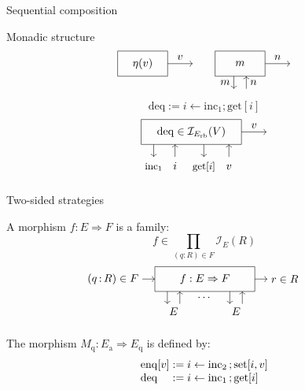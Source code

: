 \documentclass{beamer}
\newcommand{\kw}[1]{\ensuremath{ \mathrm{#1} }}
\newcommand{\deqpic}[3]{%
  \begin{tikzpicture}[scale=0.4]
    \draw (-4,-1) rectangle (4,1);
    \node (x) at (0,0) {$#1$};
    \draw[->] (-3, -1) -- (-3, -2);
    \node[anchor=base] at (-3, -3) {\small $\kw{inc}_1$};
    \draw[<-] (-1.3, -1) -- (-1.3, -2);
    \node[anchor=base] at (-1.3, -3) {$#2$};
    \draw[->] (1, -1) -- (1, -2);
    \node[anchor=base] at (1, -3) {\small $\kw{get}[#2]$};
    \draw[<-] (3, -1) -- (3, -2);
    \node[anchor=base] at (3, -3) {$#3$};
    \draw[->] (4,0) -- node[above] {$#3$} (6,0);
  \end{tikzpicture}%
}
\begin{document}
\begin{frame}[fragile]{Sequential composition}
\begin{block}{Monadic structure}
\[    %
    \begin{tikzpicture}[scale=0.4,baseline=0]
      \draw (-2,-1) rectangle (2,1);
      \draw[->] (2,0) -- node[above] {$v$} (4,0);
      \node (L) at (0,0) {$\eta(v)$};
    \end{tikzpicture}
    \qquad
    \begin{tikzpicture}[scale=0.4,baseline=0]
      \draw (-2,-1) rectangle (2,1);
      \draw[->] (2,0) -- node[above] {$n$} (4,0);
      \node (L) at (0,0) {$m$};
      \draw[->] (-0.5, -1) -- node[left]  {$m$} (-0.5, -2);
      \draw[->] ( 0.5, -2) -- node[right] {$n$} ( 0.5, -1);
    \end{tikzpicture}
  \]
\end{block}

\begin{example}
  \[
    \kw{deq} :=
      i \leftarrow \kw{inc}_1 \mathrel{;} \kw{get}[i]
  \]
  \[
    \deqpic{\kw{deq} \in \mathcal{I}_{E_\kw{rb}}(V)}{i}{v}
  \]
\end{example}
\end{frame}

\begin{frame}{Two-sided strategies} %
  \begin{definition}
    A morphism $f : E \Rightarrow F$ is a family:
    \[
      f \in \prod_{(q : R) \in F} \mathcal{I}_E(R)
    \]
    \[
      \begin{tikzpicture}[scale=0.4]
        \draw[->] (-5,0) node[left] {$(q \mathop{:} R) \in F$} -- (-4,0);
        \draw (-4,-1) rectangle (4,1);
        \draw[->] (4,0) -- (5,0) node[right] {$r \in R$};
        \node (f) at (0,0) {$f : E \Rightarrow F$};
        \draw[->] (-3, -1) -- (-3, -2);
        \draw[->] (-2, -2) -- (-2, -1);
        \node[below] at (0, -1) {$\cdots$};
        \draw[->] (2, -1) -- (2, -2);
        \draw[->] (3, -2) -- (3, -1);
        \node[below] at (-2.5, -2) {$E$};
        \node[below] at ( 2.5, -2) {$E$};
      \end{tikzpicture}
      \qquad
    \]
  \end{definition}
  \pause
  \begin{example}
    The morphism $M_\kw{q} : E_\kw{a} \Rightarrow E_\kw{q}$ is defined by:
    \[
      \begin{array}{l@{}l}
        \kw{enq}[v] & {} :=
          i \leftarrow \kw{inc}_2 \mathop{;} \kw{set}[i, v] \\
        \kw{deq} & {} :=
          i \leftarrow \kw{inc}_1 \mathop{;} \kw{get}[i]
      \end{array}
    \]
  \end{example}
\end{frame}
\end{document}
